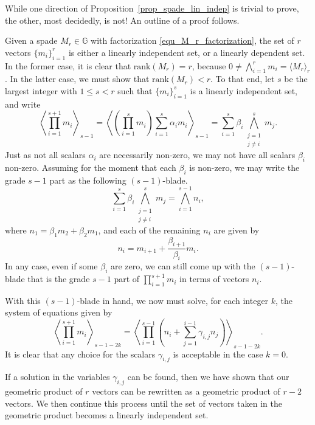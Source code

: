 \documentclass{birkjour}
\theoremstyle{definition}
\theoremstyle{remark}
\numberwithin{equation}{section}
\newcommand{\G}{\mathbb{G}}
\newcommand{\rank}{\mbox{rank}}
\begin{document}
While one direction of Proposition~\ref{prop_spade_lin_indep} is trivial to prove, the other, most decidedly, is not!  An outline of a proof follows.

Given a spade $M_r\in\G$ with factorization \eqref{equ_M_r_factorization}, the set of $r$ vectors $\{m_i\}_{i=1}^r$
is either a linearly independent set, or a linearly dependent set.  In the former case, it is clear that $\rank(M_r)=r$,
because $0\neq\bigwedge_{i=1}^r m_i=\langle M_r\rangle_r$.
In the latter case, we must show that $\rank(M_r)<r$.  To that end, let $s$ be the largest integer with $1\leq s<r$ such that
$\{m_i\}_{i=1}^s$ is a linearly independent set, and write
\begin{equation*}
\left\langle\prod_{i=1}^{s+1} m_i\right\rangle_{s-1}=\left\langle\left(\prod_{i=1}^s m_i\right)\sum_{i=1}^s\alpha_i m_i\right\rangle_{s-1} = \sum_{i=1}^s\beta_i\bigwedge_{\substack{j=1\\j\neq i}}^s m_j.
\end{equation*}
Just as not all scalars $\alpha_i$ are necessarily non-zero, we may not have all scalars $\beta_i$ non-zero.
Assuming for the moment that each $\beta_i$ is non-zero, we may write the grade $s-1$ part as the following $(s-1)$-blade.
\begin{equation*}
\sum_{i=1}^s\beta_i\bigwedge_{\substack{j=1\\j\neq i}}^s m_j = \bigwedge_{i=1}^{s-1} n_i,
\end{equation*}
where $n_1=\beta_1m_2 + \beta_2m_1$, and each of the remaining $n_i$ are given by
\begin{equation*}
n_i = m_{i+1}+\frac{\beta_{i+1}}{\beta_i}m_i.
\end{equation*}
In any case, even if some $\beta_i$ are zero, we can still come up with the $(s-1)$-blade that is the grade $s-1$ part of $\prod_{i=1}^{s+1} m_i$
in terms of vectors $n_i$.

With this $(s-1)$-blade in hand, we now must solve, for each integer $k$, the system of equations given by
\begin{equation}\label{equ_system}
\left\langle\prod_{i=1}^{s+1} m_i\right\rangle_{s-1-2k} = \left\langle\prod_{i=1}^{s-1}\left(n_i+\sum_{j=1}^{i-1}\gamma_{i,j} n_j\right)\right\rangle_{s-1-2k}.
\end{equation}
It is clear that any choice for the scalars $\gamma_{i,j}$ is acceptable in the case $k=0$.

If a solution in the variables $\gamma_{i,j}$ can be found, then we have shown that our geometric product of $r$ vectors can be rewritten as a geometric product of $r-2$ vectors.
We then continue this process until the set of vectors taken in the geometric product becomes a linearly independent set.
\end{document}

